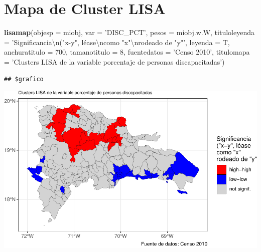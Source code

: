 \documentclass[11pt,]{article}
\newenvironment{Shaded}{\begin{snugshade}}{\end{snugshade}}
\newcommand{\KeywordTok}[1]{\textcolor[rgb]{0.13,0.29,0.53}{\textbf{#1}}}
\newcommand{\DataTypeTok}[1]{\textcolor[rgb]{0.13,0.29,0.53}{#1}}
\newcommand{\DecValTok}[1]{\textcolor[rgb]{0.00,0.00,0.81}{#1}}
\newcommand{\CharTok}[1]{\textcolor[rgb]{0.31,0.60,0.02}{#1}}
\newcommand{\StringTok}[1]{\textcolor[rgb]{0.31,0.60,0.02}{#1}}
\newcommand{\NormalTok}[1]{#1}
\begin{document}
\section{Mapa de Cluster LISA}\label{mapa-de-cluster-lisa}

\begin{Shaded}
\begin{Highlighting}[]
\KeywordTok{lisamap}\NormalTok{(}\DataTypeTok{objesp =}\NormalTok{ miobj,}
        \DataTypeTok{var =} \StringTok{'DISC_PCT'}\NormalTok{,}
        \DataTypeTok{pesos =}\NormalTok{ miobj.w.W,}
        \DataTypeTok{tituloleyenda =} \StringTok{'Significancia}\CharTok{\textbackslash{}n}\StringTok{("x-y", léase}\CharTok{\textbackslash{}n}\StringTok{como "x"}\CharTok{\textbackslash{}n}\StringTok{rodeado de "y"'}\NormalTok{,}
        \DataTypeTok{leyenda =}\NormalTok{ T,}
        \DataTypeTok{anchuratitulo =} \DecValTok{700}\NormalTok{,}
        \DataTypeTok{tamanotitulo =} \DecValTok{8}\NormalTok{,}
        \DataTypeTok{fuentedatos =} \StringTok{'Censo 2010'}\NormalTok{,}
        \DataTypeTok{titulomapa =} \StringTok{'Clusters LISA de la variable porcentaje de personas discapacitadas'}\NormalTok{)}
\end{Highlighting}
\end{Shaded}

\begin{verbatim}
## $grafico
\end{verbatim}

\includegraphics{proyecto_files/figure-latex/unnamed-chunk-26-1.pdf}
\end{document}
